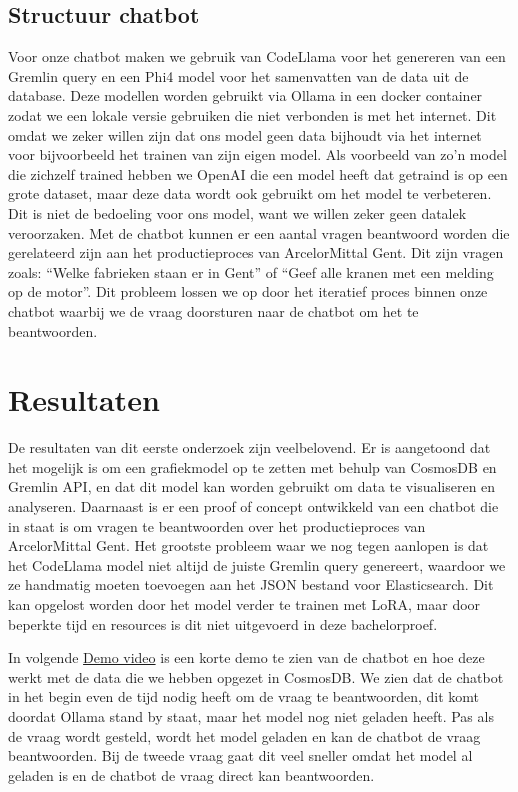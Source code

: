 \subsection{Structuur chatbot}
Voor onze chatbot maken we gebruik van CodeLlama voor het genereren van een Gremlin query en een Phi4 model voor het samenvatten van de data uit de database.
Deze modellen worden gebruikt via Ollama in een docker container zodat we een lokale versie gebruiken die niet verbonden is met het internet. Dit omdat we zeker willen zijn dat ons model geen data bijhoudt via het internet voor bijvoorbeeld het trainen van zijn eigen model.
Als voorbeeld van zo'n model die zichzelf trained hebben we OpenAI die een model heeft dat getraind is op een grote dataset, maar deze data wordt ook gebruikt om het model te verbeteren. 
Dit is niet de bedoeling voor ons model, want we willen zeker geen datalek veroorzaken.
Met de chatbot kunnen er een aantal vragen beantwoord worden die gerelateerd zijn aan het productieproces van ArcelorMittal Gent. Dit zijn vragen zoals: ``Welke fabrieken staan er in Gent'' of ``Geef alle kranen met een melding op de motor''.
Dit probleem lossen we op door het iteratief proces binnen onze chatbot waarbij we de vraag doorsturen naar de chatbot om het te beantwoorden.

\section{Resultaten}
De resultaten van dit eerste onderzoek zijn veelbelovend. Er is aangetoond dat het mogelijk is om een grafiekmodel op te zetten met behulp van CosmosDB en Gremlin API, en dat dit model kan worden gebruikt om data te visualiseren en analyseren.
Daarnaast is er een proof of concept ontwikkeld van een chatbot die in staat is om vragen te beantwoorden over het productieproces van ArcelorMittal Gent.
Het grootste probleem waar we nog tegen aanlopen is dat het CodeLlama model niet altijd de juiste Gremlin query genereert, waardoor we ze handmatig moeten toevoegen aan het JSON bestand voor Elasticsearch.
Dit kan opgelost worden door het model verder te trainen met LoRA, maar door beperkte tijd en resources is dit niet uitgevoerd in deze bachelorproef.

In volgende \href{https://youtu.be/D4-bSRYDLWM}{Demo video} is een korte demo te zien van de chatbot en hoe deze werkt met de data die we hebben opgezet in CosmosDB.\@
We zien dat de chatbot in het begin even de tijd nodig heeft om de vraag te beantwoorden, dit komt doordat Ollama stand by staat, maar het model nog niet geladen heeft.
Pas als de vraag wordt gesteld, wordt het model geladen en kan de chatbot de vraag beantwoorden. 
Bij de tweede vraag gaat dit veel sneller omdat het model al geladen is en de chatbot de vraag direct kan beantwoorden.



